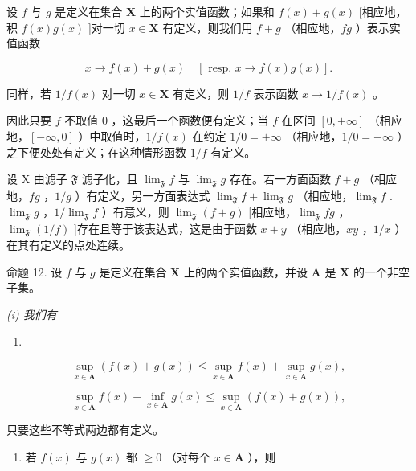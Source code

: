 设 \(f\) 与 \(g\) 是定义在集合 \(\mathbf{X}\) 上的两个实值函数；如果和 \(f(x) + g(x)\) {[}相应地，积 \(f(x)g(x)\) {]}对一切 \(x \in \mathbf{X}\) 有定义，则我们用 \(f + g\) （相应地，\(fg\) ）表示实值函数

\[
x \rightarrow f (x) + g (x) \quad [ \text { resp. } x \rightarrow f (x) g (x) ].
\]

同样，若 \(1 / f(x)\) 对一切 \(x\in \mathbf{X}\) 有定义，则 \(1 / f\) 表示函数 \(x\to 1 / f(x)\) 。

因此只要 \(f\) 不取值 \(0\) ，这最后一个函数便有定义；当 \(f\) 在区间 \([0, +\infty]\) （相应地，\([-\infty, 0]\) ）中取值时，\(1/f(x)\) 在约定 \(1/0 = +\infty\) （相应地，\(1/0 = -\infty\) ）之下便处处有定义；在这种情形函数 \(1/f\) 有定义。

设 X 由滤子 \(\mathfrak{F}\) 滤子化，且 \(\lim_{\mathfrak{F}} f\) 与 \(\lim_{\mathfrak{F}} g\) 存在。若一方面函数 \(f + g\) （相应地，\(fg\) ，\(1/g\) ）有定义，另一方面表达式 \(\lim_{\mathfrak{F}} f + \lim_{\mathfrak{F}} g\) （相应地，\(\lim_{\mathfrak{F}} f\) . \(\lim_{\mathfrak{F}} g\) ，\(1/\lim_{\mathfrak{F}} f\) ）有意义，则 \(\lim_{\mathfrak{F}} (f + g)\) {[}相应地，\(\lim_{\mathfrak{F}} fg\) ，\(\lim_{\mathfrak{F}} (1/f)\) {]}存在且等于该表达式，这是由于函数 \(x + y\) （相应地，\(xy\) ，\(1/x\) ）在其有定义的点处连续。

命题 12. 设 \(f\) 与 \(g\) 是定义在集合 \(\mathbf{X}\) 上的两个实值函数，并设 \(\mathbf{A}\) 是 \(\mathbf{X}\) 的一个非空子集。

\textit{(i) 我们有}

\begin{enumerate}
\def\labelenumi{(\arabic{enumi})}
\setcounter{enumi}{16}
\tightlist
\item
\end{enumerate}

\[
\sup _ {x \in \mathbf {A}} (f (x) + g (x)) \leqslant \sup _ {x \in \mathbf {A}} f (x) + \sup _ {x \in \mathbf {A}} g (x),\tag{17}
\]

\[
\sup _ {x \in \mathbf {A}} f (x) + \inf _ {x \in \mathbf {A}} g (x) \leqslant \sup _ {x \in \mathbf {A}} (f (x) + g (x)),\tag{18}
\]

只要这些不等式两边都有定义。

\begin{enumerate}
\def\labelenumi{(\roman{enumi})}
\setcounter{enumi}{1}
\tightlist
\item
  若 \(f(x)\) 与 \(g(x)\) 都 \(\geqslant 0\) （对每个 \(x \in \mathbf{A}\) ），则
\end{enumerate}

